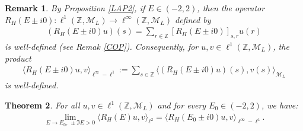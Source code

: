 \documentclass[12pt,oneside,onecolumn,open]{article}
\newtheorem{teo}{Theorem}[section]
\newtheorem{obs}[teo]{Remark}
\begin{document}
\begin{obs}\label{resobon}
By Proposition \ref{LAP2}, if $E \in (-2,2)$, then the operator 
$
    R_{H}(E\pm i0): \ell^{1}(\mathbb{Z}, \mathcal{M}_{L}) \longrightarrow \ell^{\infty}(\mathbb{Z}, \mathcal{M}_{L})
$ 
defined by 
\begin{align}
    (R_{H}(E\pm i0)u)(s) = \sum_{r\in \mathbb{Z}} [R_{H}(E\pm i0)]_{s,r} u(r)
\end{align}
is well-defined (see Remak \ref{COP}). Consequently, for $u, v \in \ell^{1}(\mathbb{Z}, \mathcal{M}_{L})$, the product
\begin{align}
    \langle R_{H}(E \pm i0)u, v \rangle _{\ell ^{\infty} - \ell^1}:= \sum_{s \in \mathbb{Z}} \langle (R_{H}(E \pm i0)u)(s), v(s) \rangle _{\mathcal{M}_L}
\end{align}
is well-defined.
\end{obs}
\begin{teo}
    For all \(u, v \in \ell^{1}(\mathbb{Z}, \mathcal{M}_{L})\) and for every \(E_{0} \in (-2,2)\), we have:
    \begin{align}
       \lim_{E \to E_{0},\, \pm \Im E > 0} \langle R_{H}(E)u, v \rangle _{\ell ^{2}}= \langle R_{H}(E_{0}\pm i0)u, v \rangle _{\ell ^{\infty} - \ell^1}.
    \end{align}
\end{teo}
\end{document}
